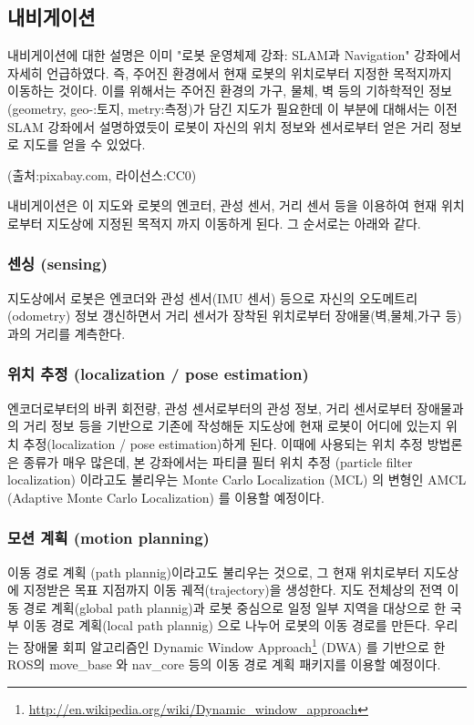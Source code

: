 \subsection{내비게이션}

내비게이션에 대한 설명은 이미 "로봇 운영체제 강좌: SLAM과 Navigation" 강좌에서 자세히 언급하였다. 즉, 주어진 환경에서 현재 로봇의 위치로부터 지정한 목적지까지 이동하는 것이다. 이를 위해서는 주어진 환경의 가구, 물체, 벽 등의 기하학적인 정보 (geometry, geo-:토지, metry:측정)가 담긴 지도가 필요한데 이 부분에 대해서는 이전  SLAM 강좌에서 설명하였듯이 로봇이 자신의 위치 정보와 센서로부터 얻은 거리 정보로 지도를 얻을 수 있었다. 

(출처:pixabay.com, 라이선스:CC0)

내비게이션은 이 지도와 로봇의 엔코터, 관성 센서, 거리 센서 등을 이용하여 현재 위치로부터 지도상에 지정된 목적지 까지 이동하게 된다. 그 순서로는 아래와 같다.

\subsubsection{센싱 (sensing)}
지도상에서 로봇은 엔코더와 관성 센서(IMU 센서) 등으로 자신의 오도메트리(odometry) 정보 갱신하면서 거리 센서가 장착된 위치로부터 장애물(벽,물체,가구 등)과의 거리를 계측한다. 

\subsubsection{위치 추정 (localization / pose estimation)}
엔코더로부터의 바퀴 회전량, 관성 센서로부터의 관성 정보, 거리 센서로부터 장애물과의 거리 정보 등을 기반으로 기존에 작성해둔 지도상에 현재 로봇이 어디에 있는지 위치 추정(localization / pose estimation)하게 된다. 이때에 사용되는 위치 추정 방법론은 종류가 매우 많은데, 본 강좌에서는 파티클 필터 위치 추정 (particle filter localization) 이라고도 불리우는 Monte Carlo Localization (MCL) 의 변형인 AMCL (Adaptive Monte Carlo Localization)\cite{thrun2005probabilistic} 를 이용할 예정이다.

\subsubsection{모션 계획 (motion planning)}
이동 경로 계획 (path plannig)이라고도 불리우는 것으로, 그 현재 위치로부터 지도상에 지정받은 목표 지점까지 이동 궤적(trajectory)을 생성한다. 지도 전체상의 전역 이동 경로 계획(global path plannig)과 로봇 중심으로 일정 일부 지역을 대상으로 한 국부 이동 경로 계획(local path plannig) 으로 나누어 로봇의 이동 경로를 만든다. 우리는 장애물 회피 알고리즘인 Dynamic Window Approach\footnote{\url{http://en.wikipedia.org/wiki/Dynamic_window_approach}} (DWA) 를 기반으로 한 ROS의 move\_base 와 nav\_core 등의 이동 경로 계획 패키지를 이용할 예정이다.

